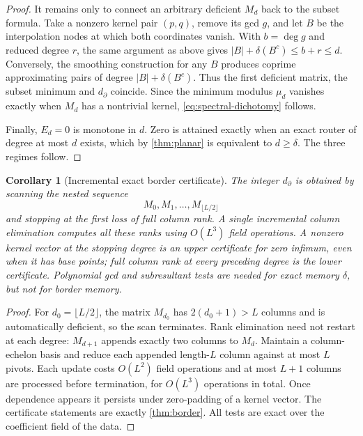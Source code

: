 \documentclass[11pt]{article}
\newtheorem{corollary}[theorem]{Corollary}
\theoremstyle{definition}\newtheorem{definition}[theorem]{Definition}\newtheorem{example}[theorem]{Example}
\theoremstyle{remark}\newtheorem{remark}[theorem]{Remark}\newtheorem{limitation}[theorem]{Limitation}
\begin{document}
\begin{proof}
It remains only to connect an arbitrary deficient $M_d$ back to the subset
formula.  Take a nonzero kernel pair $(p,q)$, remove its gcd $g$, and let $B$
be the interpolation nodes at which both coordinates vanish.  With
$b=\deg g$ and reduced degree $r$, the same argument as above gives
$|B|+\delta(B^c)\le b+r\le d$.  Conversely, the smoothing construction for
any $B$ produces coprime approximating pairs of degree
$|B|+\delta(B^c)$.  Thus the first deficient matrix, the subset minimum and
$d_\partial$ coincide.  Since the minimum modulus $\mu_d$ vanishes exactly
when $M_d$ has a nontrivial kernel, \eqref{eq:spectral-dichotomy} follows.

Finally, $E_d=0$ is monotone in $d$.  Zero is attained exactly when an exact
router of degree at most $d$ exists, which by \cref{thm:planar} is equivalent
to $d\ge\delta$.  The three regimes follow.
\end{proof}

\begin{corollary}[Incremental exact border certificate]\label{cor:border-certificate}
The integer $d_\partial$ is obtained by scanning the nested sequence
\[
                 M_0,M_1,\ldots,M_{\lfloor L/2\rfloor}
\]
and stopping at the first loss of full column rank.  A single incremental column elimination computes all these
ranks using $O(L^3)$ field operations.  A nonzero kernel vector at the stopping degree is an
upper certificate for zero infimum, even when it has base points; full column
rank at every preceding degree is the lower certificate.  Polynomial gcd and
subresultant tests are needed for exact memory $\delta$, but not for border
memory.
\end{corollary}

\begin{proof}
For $d_0=\lfloor L/2\rfloor$, the matrix $M_{d_0}$ has $2(d_0+1)>L$
columns and is automatically deficient, so the scan terminates.  Rank
elimination need not restart at each degree: $M_{d+1}$ appends exactly two
columns to $M_d$.  Maintain a column-echelon basis and reduce each appended
length-$L$ column against at most $L$ pivots.  Each update costs $O(L^2)$
field operations and at most $L+1$ columns are processed before termination,
for $O(L^3)$ operations in total.  Once dependence appears it persists under
zero-padding of a kernel vector.  The certificate statements are exactly
\cref{thm:border}.  All tests are exact over the coefficient field of the data.
\end{proof}
\end{document}

